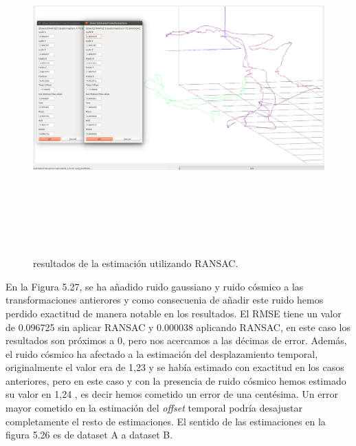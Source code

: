 \begin{figure}
\begin{center}
\label{fig:opciones de View}\includegraphics[height=12.0cm,width=18.0cm]{img/cap6/newData_EscalaTraslaRotaGaussCosmic_ab.png}
\hspace{0.5cm}

\end{center}

\caption{ resultados de la estimación  utilizando RANSAC.}
\end{figure}

En la Figura 5.27, se ha añadido ruido gaussiano y ruido cósmico a las transformaciones antierores y como consecuenia de añadir este ruido hemos perdido exactitud de manera notable en los resultados. 
El RMSE tiene un valor de 0.096725 sin aplicar RANSAC y 0.000038 aplicando RANSAC, en este caso los resultados son próximos a 0, pero nos acercamos a las décimas de error.
Además, el ruido cósmico ha afectado a la estimación del desplazamiento temporal, originalmente el valor era de 1,23 y se había estimado con exactitud en los casos anteriores, pero en este caso y con la presencia de ruido cósmico hemos estimado su valor en 1,24 , es decir hemos cometido un error de una centésima. Un error mayor cometido en la estimación del \textit{offset} temporal podría desajustar completamente el resto de estimaciones.
El sentido de las estimaciones en la figura 5.26 es de dataset A a dataset B.


